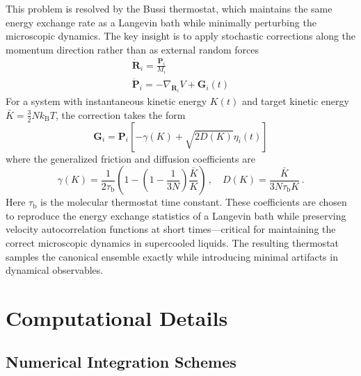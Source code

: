 \documentclass[%
 reprint,
 amsmath,amssymb,
 aps,
]{revtex4-2}
\begin{document}
This problem is resolved by the Bussi thermostat, which maintains the same energy exchange rate as a Langevin bath while minimally perturbing the microscopic dynamics.
The key insight is to apply stochastic corrections along the momentum direction rather than as external random forces
\begin{gather}
\dot{\bm{R}}_i = \frac{\bm{P}_i}{M_i} \\
\dot{\bm{P}}_i = -\nabla_{\bm{R}_i} V + \bm G_i(t)
\end{gather}
For a system with instantaneous kinetic energy $K(t)$ and target kinetic energy $\bar{K} = \frac{3}{2}Nk_\mathrm{B} T$, the correction takes the form
\begin{equation}
\bm{G}_i = \bm{P}_i \left[ -\gamma(K) + \sqrt{2 D(K)} \eta_i(t) \right]
\end{equation}
where the generalized friction and diffusion coefficients are
\begin{equation}
\gamma(K) = \frac{1}{2 \tau_\mathrm{b}} \left(1-\left(1-\frac{1}{3N}\right) \frac{\bar{K}}{K} \right) \,, \quad
D(K) = \frac{\bar{K}}{3N \tau_\mathrm{b} K} \,.
\end{equation}
Here $\tau_\mathrm{b}$ is the molecular thermostat time constant.
These coefficients are chosen to reproduce the energy exchange statistics of a Langevin bath while preserving velocity autocorrelation functions at short times---critical for maintaining the correct microscopic dynamics in supercooled liquids.
The resulting thermostat samples the canonical ensemble exactly while introducing minimal artifacts in dynamical observables.



\section{Computational Details}

\subsection{Numerical Integration Schemes}
\end{document}
